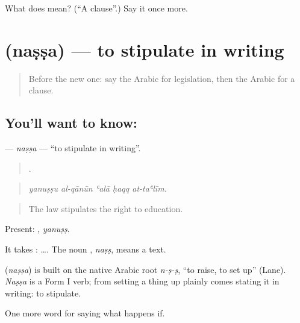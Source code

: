 \begin{tcolorbox}[breakable,colback=teal!4,colframe=teal!35!black,title={Before you move on}]
What does  mean? (\textquotedblleft{}A clause\textquotedblright{}.) Say it once more.
\end{tcolorbox}
\section[\texorpdfstring{\ar{نص} (naṣṣa)}{نص (naṣṣa)}]{ (naṣṣa) — to stipulate in writing}

\label{lesson:AR-C409-nassa}



\begin{quote}
Before the new one: say the Arabic for legislation, then the Arabic for a clause.
\end{quote}

\subsection*{You'll want to know: }
\textbf{} — \emph{naṣṣa} — \textquotedblleft{}to stipulate in writing\textquotedblright{}.

\begin{quote}
    .
\end{quote}

\begin{quote}
\emph{yanuṣṣu al-qānūn ʿalā ḥaqq at-taʿlīm.}
\end{quote}

\begin{quote}
The law stipulates the right to education.
\end{quote}

Present: , \emph{yanuṣṣ}.

It takes :   …. The noun , \emph{naṣṣ}, means a text.

\begin{cousinweb}
\textbf{} (\emph{naṣṣa}) is built on the native Arabic root \emph{n-ṣ-ṣ}, \textquotedblleft{}to raise, to set up\textquotedblright{} (Lane). \emph{Naṣṣa} is a Form I verb; from setting a thing up plainly comes stating it in writing: to stipulate.
\end{cousinweb}

\begin{grammarlens}[title={What you've built}]
One more word for saying what happens if.
\end{grammarlens}

